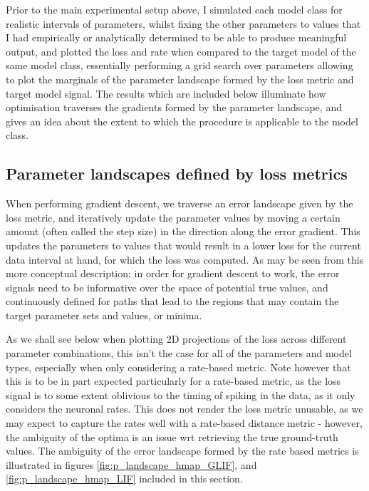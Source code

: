 \documentclass[mphil,deptreport,ianc]{infthesis} %
\begin{document}

Prior to the main experimental setup above, I simulated each model class for realistic intervals of parameters, whilst fixing the other parameters to values that I had empirically or analytically determined to be able to produce meaningful output, and plotted the loss and rate when compared to the target model of the same model class, essentially performing a grid search over parameters allowing to plot the marginals of the parameter landscape formed by the loss metric and target model signal.
The results which are included below illuminate how optimisation traverses the gradients formed by the parameter landscape, and gives an idea about the extent to which the procedure is applicable to the model class.


\subsection{Parameter landscapes defined by loss metrics}

When performing gradient descent, we traverse an error landscape given by the loss metric, and iteratively update the parameter values by moving a certain amount (often called the step size) in the direction along the error gradient. 
This updates the parameters to values that would result in a lower loss for the current data interval at hand, for which the loss was computed.
As may be seen from this more conceptual description; in order for gradient descent to work, the error signals need to be informative over the space of potential true values, and continuously defined for paths that lead to the regions that may contain the target parameter sets and values, or minima.

As we shall see below when plotting 2D projections of the loss across different parameter combinations, this isn't the case for all of the parameters and model types, especially when only considering a rate-based metric.
Note however that this is to be in part expected particularly for a rate-based metric, as the loss signal is to some extent oblivious to the timing of spiking in the data, as it only considers the neuronal rates.
This does not render the loss metric unusable, as we may expect to capture the rates well with a rate-based distance metric - however, the ambiguity of the optima is an issue wrt retrieving the true ground-truth values.
The ambiguity of the error landscape formed by the rate based metrics is illustrated in figures \ref{fig:p_landscape_hmap_GLIF}, and \ref{fig:p_landscape_hmap_LIF} included in this section.
\end{document}
